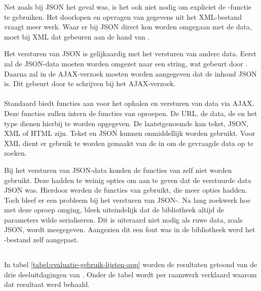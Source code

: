 Net zoals bij JSON het geval was, is het ook niet nodig om expliciet de -functie te gebruiken. 
Het doorlopen en opvragen van gegevens uit het XML-bestand vraagt meer werk. 
Waar er bij JSON direct kon worden omgegaan met de data, moet bij XML dat gebeuren aan de hand van .

Het versturen van JSON is gelijkaardig met het versturen van andere data.
Eerst zal de JSON-data moeten worden omgezet naar een string, wat gebeurt door .
Daarna zal in de AJAX-verzoek moeten worden aangegeven  dat de inhoud JSON is.
Dit gebeurt door  te schrijven bij het AJAX-verzoek.

\paragraph{\lungo}
Standaard biedt \lungo{} functies aan voor het ophalen en versturen van data via AJAX.
Deze functies zullen intern de functies van \quo{} oproepen.
De URL, de data, de  en het type dienen hierbij te worden opgegeven.
De laatstgenoemde kan tekst, JSON, XML of HTML zijn.
Tekst en JSON kunnen onmiddellijk worden gebruikt.
Voor XML dient er gebruik te worden gemaakt van de  in \quo{} om de gevraagde data op te zoeken.

Bij het versturen van JSON-data konden de functies van \lungo{} zelf niet worden gebruikt.
Deze hadden te weinig opties om aan te geven dat de verstuurde data JSON was.
Hierdoor werden de functies van \quo{} gebruikt, die meer opties hadden.
Toch bleef er een probleem bij het versturen van JSON-.
Na lang zoekwerk hoe \quo{} met deze oproep omging, bleek uiteindelijk dat de bibliotheek altijd de parameters wilde serialiseren.
Dit is uiteraard niet nodig als ruwe data, zoals JSON, wordt meegegeven.
Aangezien dit een fout was in de bibliotheek werd het \js-bestand zelf aangepast.


\subsection{}
\label{sec:evaluatie-gebruik-lijsten-app}

In tabel \ref{tabel:evaluatie-gebruik-lijsten-app} worden de resultaten getoond van de drie deeluitdagingen van .
Onder de tabel wordt per raamwerk verklaard waarom dat resultaat werd behaald.

